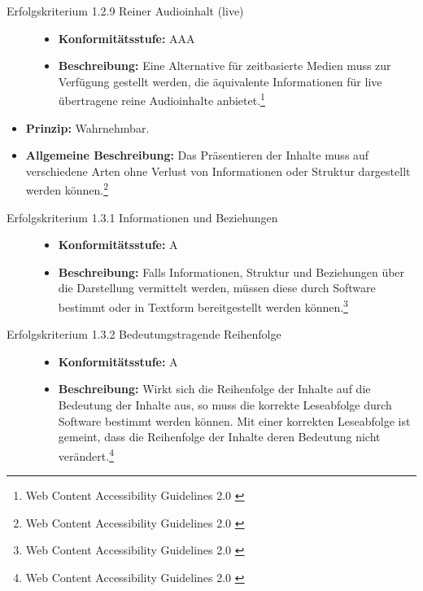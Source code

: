 \begin{description}
\begin{description}
		\item[Erfolgskriterium 1.2.9 Reiner Audioinhalt (live)]\hfill
		\begin{itemize}
			\item \textbf{Konformitätsstufe:} AAA
			\item \textbf{Beschreibung:} Eine Alternative für zeitbasierte Medien muss zur Verfügung gestellt werden, die äquivalente Informationen 
			für live übertragene reine Audioinhalte anbietet.\footnote{Web Content Accessibility Guidelines 2.0 \cite{WCAG2.0}}
		\end{itemize}
			
	\end{description}

	\item[Richtlinie 1.3 Anpassbar]\hfill
	\begin{itemize}
		\item \textbf{Prinzip:} Wahrnehmbar.
		\item \textbf{Allgemeine Beschreibung:} Das Präsentieren der Inhalte muss auf verschiedene Arten ohne Verlust von Informationen oder 
		Struktur dargestellt werden können.\footnote{Web Content Accessibility Guidelines 2.0 \cite{WCAG2.0}}
	\end{itemize}
	
	\begin{description}
		\item[Erfolgskriterium 1.3.1 Informationen und Beziehungen]\hfill
		\begin{itemize}
			\item \textbf{Konformitätsstufe:} A
			\item \textbf{Beschreibung:} Falls Informationen, Struktur und Beziehungen über die Darstellung vermittelt werden, müssen diese durch Software bestimmt 
			oder in Textform bereitgestellt werden können.\footnote{Web Content Accessibility Guidelines 2.0 \cite{WCAG2.0}}
		\end{itemize}
			
		\item[Erfolgskriterium 1.3.2 Bedeutungstragende Reihenfolge]\hfill
		\begin{itemize}
			\item \textbf{Konformitätsstufe:} A
			\item \textbf{Beschreibung:} Wirkt sich die Reihenfolge der Inhalte auf die Bedeutung der Inhalte aus, so muss die korrekte Leseabfolge durch Software 
			bestimmt werden können. Mit einer korrekten Leseabfolge ist gemeint, dass die Reihenfolge der Inhalte deren Bedeutung nicht 
			verändert.\footnote{Web Content Accessibility Guidelines 2.0 \cite{WCAG2.0}}
		\end{itemize}
			

\end{description}
\end{description}
